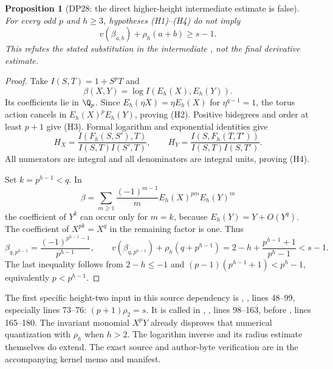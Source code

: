 \documentclass[11pt,a4paper]{article}
\newtheorem{proposition}[theorem]{Proposition}
\theoremstyle{definition}\newtheorem{remark}[theorem]{Remark}
\begin{document}
\begin{proposition}[DP28: the direct higher-height intermediate estimate is false]\label{DP28}
For every odd $p$ and $h\ge3$, hypotheses (H1)--(H4) do not imply
\[
 v(\beta_{a,b})+\rho_h(a+b)\ge s-1.
\]
This refutes the stated substitution in the intermediate , not the final derivative estimate.
\end{proposition}
\begin{proof}
Take $I(S,T)=1+S^pT$ and
\[
 \beta(X,Y)=\log I(E_h(X),E_h(Y)).
\]
Its coefficients lie in $\Q_p$. Since $E_h(\eta X)=\eta E_h(X)$ for $\eta^{q-1}=1$, the torus action cancels in $E_h(X)^pE_h(Y)$, proving (H2). Positive bidegrees and order at least $p+1$ give (H3). Formal logarithm and exponential identities give
\[
 H_X=\frac{I(F_h(S,S'),T)}{I(S,T)I(S',T)},\qquad
 H_Y=\frac{I(S,F_h(T,T'))}{I(S,T)I(S,T')}.
\]
All numerators are integral and all denominators are integral units, proving (H4).

Set $k=p^{h-1}<q$. In
\[
 \beta=\sum_{m\ge1}\frac{(-1)^{m-1}}m E_h(X)^{pm}E_h(Y)^m
\]
the coefficient of $Y^k$ can occur only for $m=k$, because $E_h(Y)=Y+O(Y^q)$. The coefficient of $X^{pk}=X^q$ in the remaining factor is one. Thus
\[
 \beta_{q,p^{h-1}}=\frac{(-1)^{p^{h-1}-1}}{p^{h-1}},\qquad
 v(\beta_{q,p^{h-1}})+\rho_h(q+p^{h-1})
 =2-h+\frac{p^{h-1}+1}{p^h-1}<s-1.
\]
The last inequality follows from $2-h\le-1$ and $(p-1)(p^{h-1}+1)<p^h-1$, equivalently $p<p^{h-1}$.
\end{proof}

The first specific height-two input in this source dependency is , , lines 48--99, especially lines 73--76: $(p+1)\rho_2=s$. It is called in , , lines 98--163, before , lines 165--180. The invariant monomial $X^pY$ already disproves that numerical quantization with $\rho_h$ when $h>2$. The logarithm inverse and its radius estimate themselves do extend. The exact source and author-byte verification are in the accompanying kernel memo and manifest.
\end{document}
